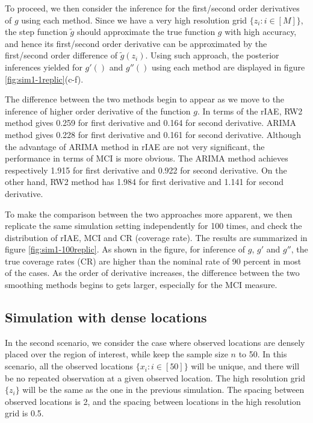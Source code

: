 \documentclass{article}
\begin{document}
To proceed, we then consider the inference for the first/second order derivatives of $g$ using each method. Since we have a very high resolution grid $\{z_i: i\in [M]\}$, the step function $\tilde{g}$ should approximate the true function $g$ with high accuracy, and hence its first/second order derivative can be approximated by the first/second order difference of $\tilde{g}(z_i)$. Using such approach, the posterior inferences yielded for $g'()$ and $g''()$ using each method are displayed in figure \ref{fig:sim1-1replic}(c-f). 

The difference between the two methods begin to appear as we move to the inference of higher order derivative of the function $g$. In terms of the rIAE, RW2 method gives 0.259 for first derivative and 0.164 for second derivative. ARIMA method gives 0.228 for first derivative and 0.161 for second derivative. Although the advantage of ARIMA method in rIAE are not very significant, the performance in terms of MCI is more obvious. The ARIMA method achieves respectively 1.915 for first derivative and 0.922 for second derivative. On the other hand, RW2 method has 1.984 for first derivative and 1.141 for second derivative.

To make the comparison between the two approaches more apparent, we then replicate the same simulation setting independently for 100 times, and check the distribution of rIAE, MCI and CR (coverage rate). The results are summarized in figure \ref{fig:sim1-100replic}. As shown in the figure, for inference of $g$, $g'$ and $g''$, the true coverage rates (CR) are higher than the nominal rate of 90 percent in most of the cases. As the order of derivative increases, the difference between the two smoothing methods begins to gets larger, especially for the MCI measure. 







\subsection{Simulation with dense locations}

In the second scenario, we consider the case where observed locations are densely placed over the region of interest, while keep the sample size $n$ to 50. In this scenario, all the observed locations $\{x_i: i\in [50]\}$ will be unique, and there will be no repeated observation at a given observed location. The high resolution grid $\{z_i\}$ will be the same as the one in the previous simulation. The spacing between observed locations is 2, and the spacing between locations in the high resolution grid is 0.5. 
\end{document}
